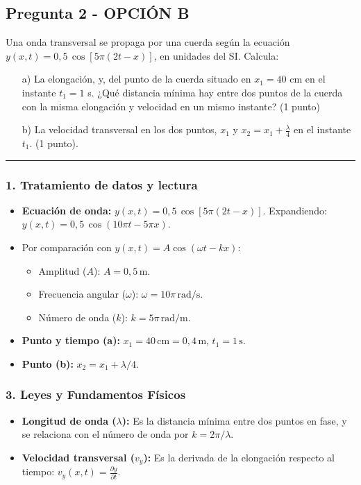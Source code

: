 \subsection{Pregunta 2 - OPCIÓN B}
\label{subsec:2B_2018_jul_ext}
\begin{cajaenunciado}
Una onda transversal se propaga por una cuerda según la ecuación $y(x,t)=0,5\,\cos[5\pi(2t-x)]$, en unidades del SI. Calcula:
\begin{enumerate}
    \item[a)] La elongación, y, del punto de la cuerda situado en $x_{1}=40$ cm en el instante $t_{1}=1$ s. ¿Qué distancia mínima hay entre dos puntos de la cuerda con la misma elongación y velocidad en un mismo instante? (1 punto)
    \item[b)] La velocidad transversal en los dos puntos, $x_{1}$ y $x_{2}=x_{1}+\frac{\lambda}{4}$ en el instante $t_{1}$. (1 punto).
\end{enumerate}
\end{cajaenunciado}
\hrule
\subsubsection*{1. Tratamiento de datos y lectura}
\begin{itemize}
    \item \textbf{Ecuación de onda:} $y(x,t)=0,5\,\cos[5\pi(2t-x)]$. Expandiendo: $y(x,t)=0,5\,\cos(10\pi t - 5\pi x)$.
    \item Por comparación con $y(x,t)=A\cos(\omega t - kx)$:
        \begin{itemize}
            \item Amplitud ($A$): $A=0,5\,\text{m}$.
            \item Frecuencia angular ($\omega$): $\omega=10\pi\,\text{rad/s}$.
            \item Número de onda ($k$): $k=5\pi\,\text{rad/m}$.
        \end{itemize}
    \item \textbf{Punto y tiempo (a):} $x_1=40\,\text{cm}=0,4\,\text{m}$, $t_1=1\,\text{s}$.
    \item \textbf{Punto (b):} $x_2=x_1+\lambda/4$.
\end{itemize}
\subsubsection*{3. Leyes y Fundamentos Físicos}
\begin{itemize}
    \item \textbf{Longitud de onda ($\lambda$):} Es la distancia mínima entre dos puntos en fase, y se relaciona con el número de onda por $k=2\pi/\lambda$.
    \item \textbf{Velocidad transversal ($v_y$):} Es la derivada de la elongación respecto al tiempo: $v_y(x,t) = \frac{\partial y}{\partial t}$.
\end{itemize}
